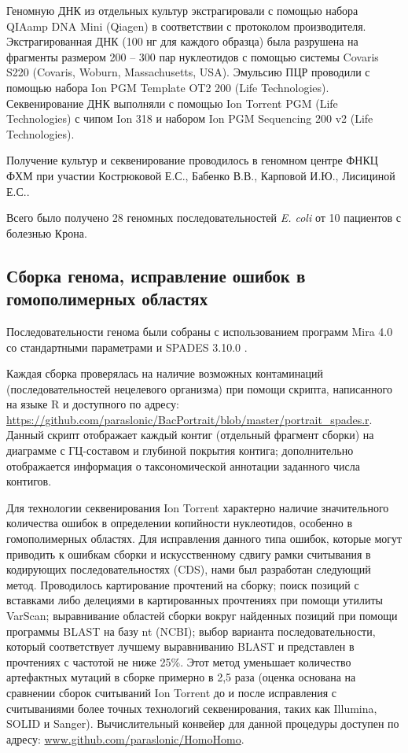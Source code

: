 Геномную ДНК из отдельных культур экстрагировали с помощью набора QIAamp DNA Mini (Qiagen) в соответствии с протоколом производителя. Экстрагированная ДНК (100 нг для каждого образца) была разрушена на фрагменты размером 200 – 300 пар нуклеотидов с помощью системы Covaris S220 (Covaris, Woburn, Massachusetts, USA). Эмульсию ПЦР проводили с помощью набора Ion PGM Template OT2 200 (Life Technologies). Секвенирование ДНК выполняли с помощью Ion Torrent PGM (Life Technologies) с чипом Ion 318 и набором Ion PGM Sequencing 200 v2 (Life Technologies). 

Получение культур и секвенирование проводилось в геномном центре ФНКЦ ФХМ при участии Кострюковой Е.С., Бабенко В.В., Карповой И.Ю., Лисициной Е.С..

Всего было получено 28 геномных последовательностей \textit{E. coli} от 10 пациентов с болезнью Крона.

\subsection{Сборка генома, исправление ошибок в гомополимерных областях}
Последовательности генома были собраны с использованием программ Mira 4.0 \cite{chevreux1999genome} со стандартными параметрами и SPADES 3.10.0 \cite{bankevich2012spades}.

Каждая сборка проверялась на наличие возможных контаминаций (последовательностей нецелевого организма) при помощи скрипта, написанного на языке R и доступного по адресу: \url{https://github.com/paraslonic/BacPortrait/blob/master/portrait\_spades.r}. Данный скрипт отображает каждый контиг (отдельный фрагмент сборки) на диаграмме с ГЦ-составом и глубиной покрытия контига; дополнительно отображается информация о таксономической аннотации заданного числа контигов. 
 
Для технологии секвенирования Ion Torrent характерно наличие значительного количества ошибок в определении копийности нуклеотидов, особенно в гомополимерных областях. Для исправления данного типа ошибок, которые могут приводить к ошибкам сборки и искусственному сдвигу рамки считывания в кодирующих последовательностях (CDS), нами был разработан следующий метод. Проводилось картирование прочтений на сборку; поиск позиций с вставками либо делециями в картированных прочтениях при помощи утилиты VarScan; выравнивание областей сборки вокруг найденных позиций при помощи программы BLAST на базу nt (NCBI); выбор варианта последовательности, который соответствует лучшему выравниванию BLAST и представлен в прочтениях с частотой не ниже 25\%. Этот метод уменьшает количество артефактных мутаций в сборке примерно в 2,5 раза (оценка основана на сравнении сборок считываний Ion Torrent до и после исправления с считываниями более точных технологий секвенирования, таких как Illumina, SOLID и Sanger). Вычислительный конвейер для данной процедуры доступен по адресу: \url{www.github.com/paraslonic/HomoHomo}.

